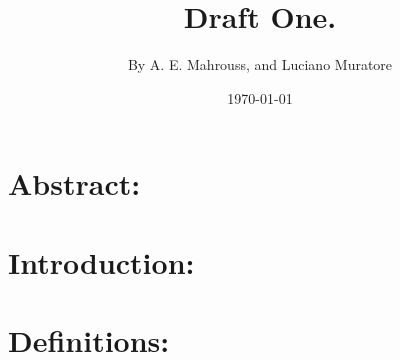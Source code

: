 \documentclass[10pt]{article}
\title{%
	\vspace{-1.5em}%
	\large\textbf{Draft One.}%
}
\author{By A. E. Mahrouss, and Luciano Muratore}
\date{\today}
\theoremstyle{plain}
\theoremstyle{definition}
\theoremstyle{remark}
\begin{document}
	
	\maketitle
	\tableofcontents
	\newpage

\section{Abstract:}
	
\section{Introduction:}

\section{Definitions:}

\nocite{*}


\end{document}
